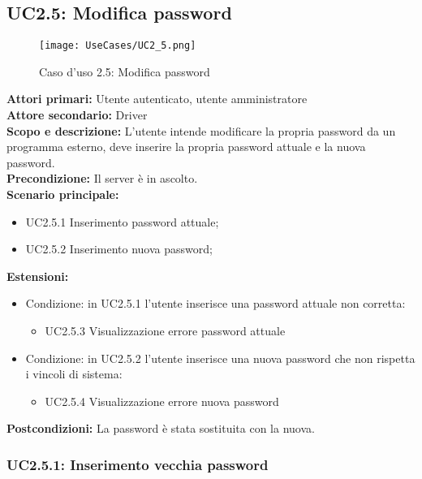 \documentclass{scalatekids-article}
\begin{document}
\subsection{UC2.5: Modifica password}

\begin{figure}[H]
  \begin{center}
    \texttt{[image: UseCases/UC2\_5.png]}
    \caption*{Caso d'uso 2.5: Modifica password}
  \end{center}
\end{figure}
\textbf{Attori primari:} Utente autenticato, utente amministratore\\
\textbf{Attore secondario:} Driver\\
\textbf{Scopo e descrizione:} L'utente intende modificare la propria password da un programma  esterno, deve inserire la propria password attuale e la nuova password.\\
\textbf{Precondizione:} Il server è in ascolto.\\
\textbf{Scenario principale:}
\begin{itemize}
\item UC2.5.1 Inserimento password attuale;
\item UC2.5.2 Inserimento nuova password;
\end{itemize}
\textbf{Estensioni:} %
\begin{itemize}
\item Condizione: in UC2.5.1 l'utente inserisce una password attuale non corretta:
  \begin{itemize}
  \item UC2.5.3 Visualizzazione errore password attuale
  \end{itemize}
\item Condizione: in UC2.5.2 l'utente inserisce una nuova password che non rispetta i vincoli di sistema:
  \begin{itemize}
  \item UC2.5.4 Visualizzazione errore nuova password
  \end{itemize}
\end{itemize}
\textbf{Postcondizioni:} La password è stata sostituita con la nuova.

\subsubsection{UC2.5.1: Inserimento vecchia password}
\end{document}
